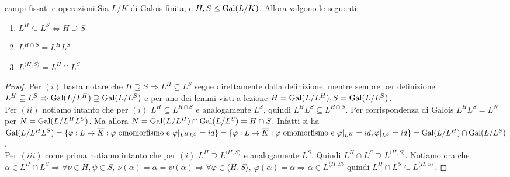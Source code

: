 \begin{theorem}{campi fissati e operazioni}
    Sia $L/K$ di Galois finita, e $H,S \leq \text{Gal}(L/K)$. Allora valgono le seguenti:
    \begin{enumerate}[label=($\roman*$)]
        \item $L^H \subseteq L^S \iff H \supseteq S$
        \item $L^{H\cap S} = L^HL^S$
        \item $L^{\langle H, S \rangle} = L^H \cap L^S$
    \end{enumerate}
    \begin{minipage}{0.5\textwidth}  
    \end{minipage}\hfill
    \begin{minipage}{0.5\textwidth}  
    \end{minipage}\hfill
\end{theorem}
\begin{proof}
 Per $(i)$ basta notare che $H \supseteq S \Rightarrow L^H \subseteq L^S$ segue direttamente dalla definizione, mentre sempre per definizione  $L^H \subseteq L^S \Rightarrow \text{Gal}(L/L^H) \supseteq \text{Gal}(L/L^S)$ e per uno dei lemmi visti a lezione $H = \text{Gal}(L/L^H), S = \text{Gal}(L/L^S)$. \\
Per $(ii)$ notiamo intanto che per $(i)$ $L^H \subseteq L^{H\cap S}$ e analogamente $L^S$, quindi $L^HL^S \subseteq L^{H\cap S}$. Per corrispondenza di Galois $L^HL^S = L^N$ per $N = \text{Gal}(L/L^HL^S)$. Ma allora $N = \text{Gal}(L/L^H) \cap \text{Gal}(L/L^S) = H \cap S$. Infatti si ha $\text{Gal}(L/L^HL^S) =  \{\varphi : L \rightarrow \overline{K} : \varphi \text{ omomorfismo e } \varphi|_{L^HL^S} = id\} = \{\varphi : L \rightarrow \overline{K} : \varphi \text{ omomorfismo e }\varphi|_{L^H} = id, \varphi|_{L^S} = id\} = \text{Gal}(L/L^H) \cap \text{Gal}(L/L^S)$.\\
Per $(iii)$ come prima notiamo intanto che per $(i)$ $L^H \supseteq L^{\langle H, S \rangle}$ e analogamente $L^S$. Quindi $L^H \cap L^S \supseteq L^{\langle H, S \rangle}$. Notiamo ora che $\alpha \in L^H \cap L^S \Rightarrow \forall \nu \in H, \psi \in S, \ \nu(\alpha)=\alpha = \psi(\alpha) \Rightarrow \forall \varphi \in \langle H, S \rangle, \ \varphi(\alpha)=\alpha \Rightarrow \alpha \in L^{\langle H, S \rangle}$  quindi $L^H \cap L^S \subseteq L^{\langle H, S \rangle}$.
\end{proof}

